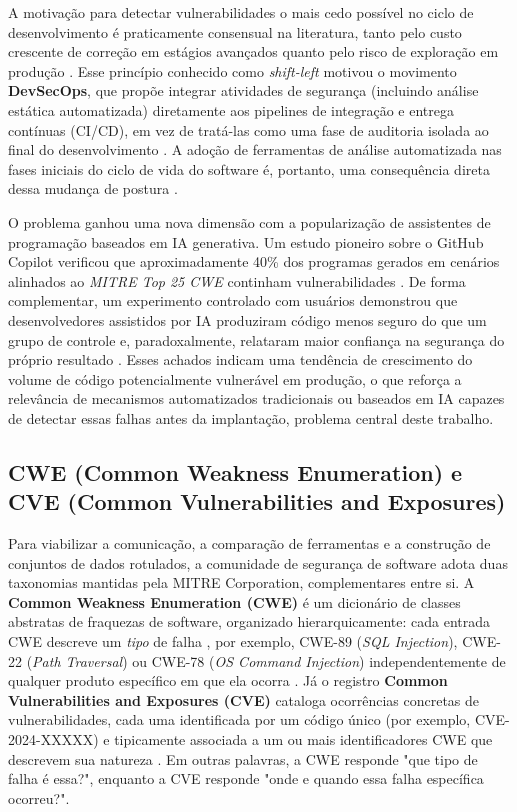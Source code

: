 A motivação para detectar vulnerabilidades o mais cedo possível no ciclo de desenvolvimento é praticamente consensual na literatura, tanto pelo custo crescente de correção em estágios avançados quanto pelo risco de exploração em produção \cite{Dalaq2025SASTSLR, Shiri2024MLSLR}. Esse princípio conhecido como \textit{shift-left}  motivou o movimento \textbf{DevSecOps}, que propõe integrar atividades de segurança (incluindo análise estática automatizada) diretamente aos pipelines de integração e entrega contínuas (CI/CD), em vez de tratá-las como uma fase de auditoria isolada ao final do desenvolvimento \cite{Myrbakken2017DevSecOps}. A adoção de ferramentas de análise automatizada nas fases iniciais do ciclo de vida do software é, portanto, uma consequência direta dessa mudança de postura \cite{Wadhams2024SASTBarriers}.

O problema ganhou uma nova dimensão com a popularização de assistentes de programação baseados em IA generativa. Um estudo pioneiro sobre o GitHub Copilot verificou que aproximadamente 40\% dos programas gerados em cenários alinhados ao \textit{MITRE Top 25 CWE} continham vulnerabilidades \cite{Pearce2022CopilotSecurity}. De forma complementar, um experimento controlado com usuários demonstrou que desenvolvedores assistidos por IA produziram código menos seguro do que um grupo de controle e, paradoxalmente, relataram maior confiança na segurança do próprio resultado \cite{Perry2023InsecureAICode}. Esses achados indicam uma tendência de crescimento do volume de código potencialmente vulnerável em produção, o que reforça a relevância de mecanismos automatizados tradicionais ou baseados em IA capazes de detectar essas falhas antes da implantação, problema central deste trabalho.

\subsection{CWE (Common Weakness Enumeration) e CVE (Common Vulnerabilities and Exposures)}\label{subsec:cwe-cve}
Para viabilizar a comunicação, a comparação de ferramentas e a construção de conjuntos de dados rotulados, a comunidade de segurança de software adota duas taxonomias mantidas pela MITRE Corporation, complementares entre si. A \textbf{Common Weakness Enumeration (CWE)} é um dicionário de classes abstratas de fraquezas de software, organizado hierarquicamente: cada entrada CWE descreve um \textit{tipo} de falha , por exemplo, CWE-89 (\textit{SQL Injection}), CWE-22 (\textit{Path Traversal}) ou CWE-78 (\textit{OS Command Injection}) independentemente de qualquer produto específico em que ela ocorra \cite{MITRECWE2024}. Já o registro \textbf{Common Vulnerabilities and Exposures (CVE)} cataloga ocorrências concretas de vulnerabilidades, cada uma identificada por um código único (por exemplo, CVE-2024-XXXXX) e tipicamente associada a um ou mais identificadores CWE que descrevem sua natureza \cite{MITRECVE2024}. Em outras palavras, a CWE responde "que tipo de falha é essa?", enquanto a CVE responde "onde e quando essa falha específica ocorreu?".

